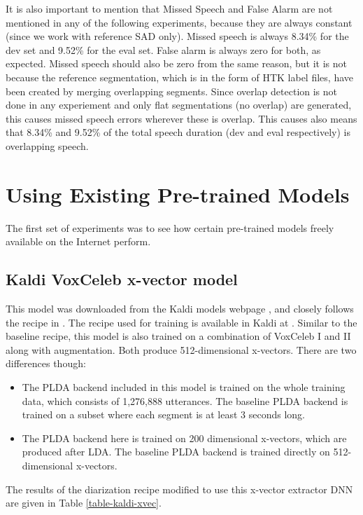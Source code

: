 	It is also important to mention that Missed Speech and False Alarm are not mentioned in any of the following experiments, because they are always constant (since we work with reference SAD only). Missed speech is always 8.34\% for the dev set and 9.52\% for the eval set. False alarm is always zero for both, as expected. Missed speech should also be zero from the same reason, but it is not because the reference segmentation, which is in the form of HTK label files, have been created by merging overlapping segments. Since overlap detection is not done in any experiement and only flat segmentations (no overlap) are generated, this causes missed speech errors wherever these is overlap. This causes also means that 8.34\% and 9.52\% of the total speech duration (dev and eval respectively) is overlapping speech.
		
	\section{Using Existing Pre-trained Models}
	The first set of experiments was to see how certain pre-trained models freely available on the Internet perform.
	
		\subsection{Kaldi VoxCeleb x-vector model}
			This model was downloaded from the Kaldi models webpage \cite{kaldi_models_webpage}, and closely follows the recipe in \cite{snyder2018x}. The recipe used for training is available in Kaldi at . Similar to the baseline recipe, this model is also trained on a combination of VoxCeleb I and II along with augmentation. Both produce 512-dimensional x-vectors. There are two differences though:
			\begin{itemize}
				\item The PLDA backend included in this model is trained on the whole training data, which consists of 1,276,888 utterances. The baseline PLDA backend is trained on a subset where each segment is at least 3 seconds long.
				\item The PLDA backend here is trained on 200 dimensional x-vectors, which are produced after LDA. The baseline PLDA backend is trained directly on 512-dimensional x-vectors.
			\end{itemize}
			
			The results of the diarization recipe modified to use this x-vector extractor DNN are given in Table \ref{table-kaldi-xvec}.
	
